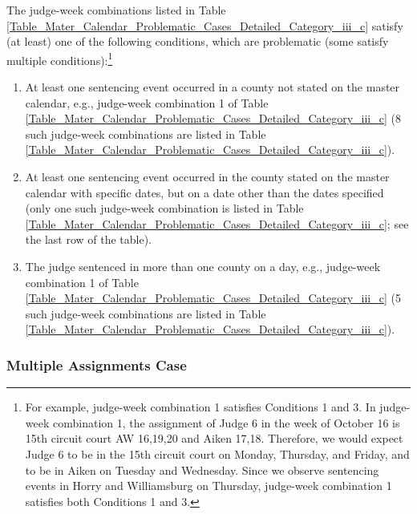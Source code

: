 \documentclass[11pt, oneside]{article}   	%
\theoremstyle{ModifiedStyle}
\begin{document}
The judge-week combinations listed in Table \ref{Table_Mater_Calendar_Problematic_Cases_Detailed_Category_iii_c} satisfy (at least) one of the following conditions, which are problematic (some satisfy multiple conditions):\footnote{For example, judge-week combination 1 satisfies Conditions 1 and 3. In judge-week combination 1, the assignment of Judge 6 in the week of October 16 is 15th circuit court AW 16,19,20 and Aiken 17,18. Therefore, we would expect Judge 6 to be in the 15th circuit court on Monday, Thursday, and Friday, and to be in Aiken on Tuesday and Wednesday. Since we observe sentencing events in Horry and Williamsburg on Thursday, judge-week combination 1 satisfies both Conditions 1 and 3.}
\begin{enumerate}
	\vspace{-3mm}
	\item At least one sentencing event occurred in a county not stated on the master calendar, e.g., judge-week combination 1 of Table \ref{Table_Mater_Calendar_Problematic_Cases_Detailed_Category_iii_c} (8 such judge-week combinations are listed in Table \ref{Table_Mater_Calendar_Problematic_Cases_Detailed_Category_iii_c}).
	\vspace{-2mm}
	\item At least one sentencing event occurred in the county stated on the master calendar with specific dates, but on a date other than the dates specified (only one such judge-week combination is listed in Table \ref{Table_Mater_Calendar_Problematic_Cases_Detailed_Category_iii_c}; see the last row of the table).
	\vspace{-2mm}
	\item The judge sentenced in more than one county on a day, e.g., judge-week combination 1 of Table \ref{Table_Mater_Calendar_Problematic_Cases_Detailed_Category_iii_c} (5 such judge-week combinations are listed in Table \ref{Table_Mater_Calendar_Problematic_Cases_Detailed_Category_iii_c}).
\end{enumerate}
\vspace{-3mm}

\subsubsection{Multiple Assignments Case}
\label{Sec:Master_Calendar:Further_Analysis_of_Some_Assignments:Category_iv}
\end{document}
